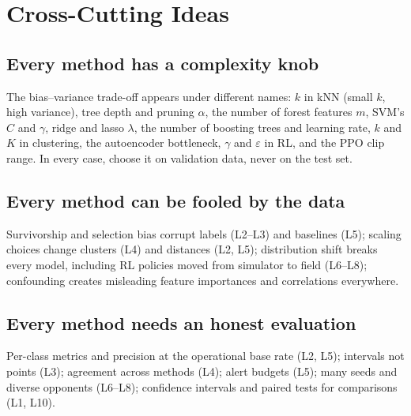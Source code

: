 \documentclass[11pt]{article}
\begin{document}
\section{Cross-Cutting Ideas}
\subsection{Every method has a complexity knob}
The bias--variance trade-off appears under different names: $k$ in kNN (small $k$, high variance), tree depth and pruning $\alpha$, the number of forest features $m$, SVM's $C$ and $\gamma$, ridge and lasso $\lambda$, the number of boosting trees and learning rate, $k$ and $K$ in clustering, the autoencoder bottleneck, $\gamma$ and $\varepsilon$ in RL, and the PPO clip range. In every case, choose it on validation data, never on the test set.
\subsection{Every method can be fooled by the data}
Survivorship and selection bias corrupt labels (L2--L3) and baselines (L5); scaling choices change clusters (L4) and distances (L2, L5); distribution shift breaks every model, including RL policies moved from simulator to field (L6--L8); confounding creates misleading feature importances and correlations everywhere.
\subsection{Every method needs an honest evaluation}
Per-class metrics and precision at the operational base rate (L2, L5); intervals not points (L3); agreement across methods (L4); alert budgets (L5); many seeds and diverse opponents (L6--L8); confidence intervals and paired tests for comparisons (L1, L10).
\end{document}
